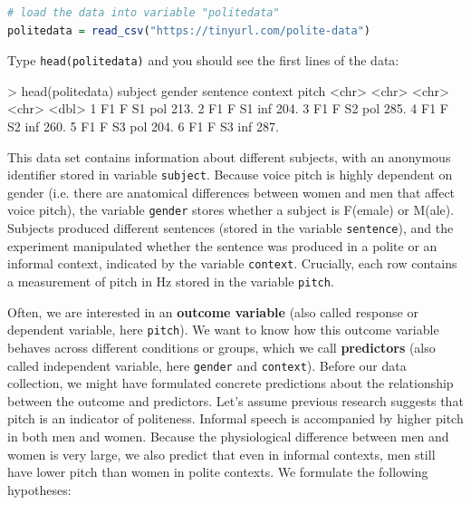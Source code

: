 \documentclass[nobib]{tufte-handout}
\newcommand{\ri}[1]{\lstinline{#1}}  %
\begin{document}
\begin{minipage}[]{\textwidth}
\begin{lstlisting}[language=R]
# load the data into variable "politedata"
politedata = read_csv("https://tinyurl.com/polite-data")
\end{lstlisting}
\end{minipage}

\vspace*{-0.5cm}

\noindent Type \ri{head(politedata)} and you should see the first lines of the
data:

\begin{minipage}[]{\textwidth}
\begin{rc}
> head(politedata)
   subject gender sentence context pitch
   <chr>   <chr>  <chr>    <chr>   <dbl>
 1 F1      F      S1       pol      213.
 2 F1      F      S1       inf      204.
 3 F1      F      S2       pol      285.
 4 F1      F      S2       inf      260.
 5 F1      F      S3       pol      204.
 6 F1      F      S3       inf      287.
\end{rc}
\end{minipage}

\vspace{-0.5cm}


\noindent This data set contains information about different subjects, with an anonymous identifier stored in variable \texttt{subject}.
Because voice pitch is highly dependent on gender (i.e. there are anatomical differences between women and men that affect voice pitch), the variable \texttt{gender} stores whether a subject is F(emale) or M(ale).
Subjects produced different sentences (stored in the variable \texttt{sentence}), and the experiment manipulated whether the sentence was produced in a polite or an informal context, indicated by the variable \texttt{context}. Crucially, each row contains a measurement of pitch in Hz stored in the variable \texttt{pitch}.

Often, we are interested in an \textbf{outcome variable} (also called response or dependent variable, here \texttt{pitch}). We want to know how this outcome variable behaves
across different conditions or groups, which we call \textbf{predictors} (also called independent variable, here \texttt{gender} and \texttt{context}). Before our data collection,
we might have formulated concrete predictions about the relationship between the outcome and predictors. Let's assume previous research suggests that pitch is an indicator of politeness. Informal speech is accompanied by higher pitch in both men and women. Because the physiological difference between men and women is very large, we also predict that even in informal contexts, men still have lower pitch than women in polite contexts. We formulate the following hypotheses:
\end{document}
